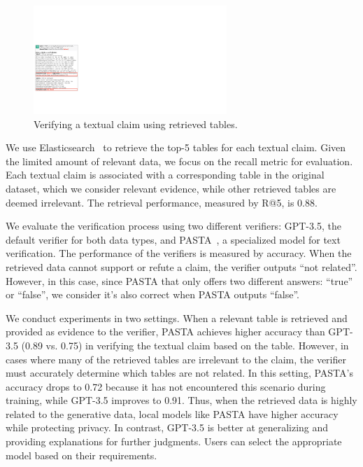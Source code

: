 \begin{figure}[t!]
\vspace{1em}
\begin{center}
  \includegraphics[width=0.65\textwidth]{submissions/Nan2024/figs/tabfact.pdf}
  \caption{Verifying a textual claim using retrieved tables.}
  \label{fig:claim_case} 
\end{center}
\end{figure}


We use Elasticsearch~\cite{elasticsearch} to retrieve the top-5 tables for each textual claim. Given the limited amount of relevant data, we focus on the recall metric for evaluation. Each textual claim is associated with a corresponding table in the original dataset, which we consider relevant evidence, while other retrieved tables are deemed irrelevant. The retrieval performance, measured by R@5, is 0.88.

We evaluate the verification process using two different verifiers: GPT-3.5, the default verifier for both data types, and PASTA~\cite{pasta}, a specialized model for text verification.
%
The performance of the verifiers is measured by accuracy. When the retrieved data cannot support or refute a claim, the verifier outputs ``not related''. However, in this case, since PASTA that only offers two different answers: ``true'' or ``false'', we consider it's also correct when PASTA outputs ``false''.

We conduct experiments in two settings. When a relevant table is retrieved and provided as evidence to the verifier, PASTA achieves higher accuracy than GPT-3.5 (0.89 vs. 0.75) in verifying the textual claim based on the table. However, in cases where many of the retrieved tables are irrelevant to the claim, the verifier must accurately determine which tables are not related. In this setting, PASTA's accuracy drops to 0.72 because it has not encountered this scenario during training, while GPT-3.5 improves to 0.91. 
Thus, when the retrieved data is highly related to the generative data, local models like PASTA have higher accuracy while protecting privacy. In contrast, GPT-3.5 is better at generalizing and providing explanations for further judgments. Users can select the appropriate model based on their requirements.


